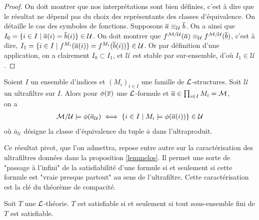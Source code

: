 \begin{proof}
On doit montrer que nos interprétations sont bien définies, c'est à dire que le résultat ne dépend pas du choix des représentants des classes d'équivalence.
On détaille le cas des symboles de fonctions.
Supposons $\overline{a} \equiv_{\mathcal{U}} \overline{b}$. On a ainsi que $I_0 = \{ i \in I \mid \overline{a}(i) = \overline{b}(i) \} \in \mathcal{U}$.
On doit montrer que $f^{\mathcal{M}/\mathcal{U}}(\overline{a}) \equiv_{\mathcal{U}} f^{\mathcal{M}/\mathcal{U}}(\overline{b})$, c'est à dire,
$I_1 = \{ i \in I \mid f^{M_i}(\overline{a}(i)) = f^{M_i}(\overline{b}(i)) \} \in \mathcal{U}$. Or par définition d'une application,
on a clairement $I_0 \subset I_1$, et $\mathcal{U}$ est stable par sur-ensemble, d'où $I_1 \in \mathcal{U}$.
\end{proof}


\begin{theo}[théorème de \L{}oś]\label{Los}
Soient $I$ un ensemble d'indices et $(M_i)_{i \in I}$ une famille de $\mathcal{L}$-structures. Soit $\mathcal{U}$ un ultrafiltre sur $I$.
Alors pour $\phi(\overline{x})$ une $\mathcal{L}$-formule et $\overline{a} \in \prod_{i \in I} M_i = \mathcal{M}$,\\on a
\begin{align*}
\mathcal{M}/\mathcal{U} \models \phi(\overline{a}_{\mathcal{U}}) \iff \{ i \in I \mid M_i \models \phi(\overline{a}(i)) \} \in \mathcal{U}
\end{align*}
où $\bar{a}_\mathcal{U}$ désigne la classe d'équivalence du tuple $\bar{a}$ dans l'ultraproduit.
\end{theo}

\begin{rema}
Ce résultat pivot, que l'on admettra, repose entre autre sur la caractérisation des ultrafiltres données dans la proposition \ref{lemmelos}.
Il permet une sorte de "passage à l'infini" de la satisfiabilité d'une formule si et seulement si
cette formule est "vraie presque partout" au sens de l'ultrafiltre. Cette caractérisation est la clé du théorème de compacité.
\end{rema}

\begin{theo}\label{theo-compacite}
Soit $T$ une $\mathcal{L}$-théorie. $T$ est satisfiable si et seulement si tout sous-ensemble fini de $T$ est satisfiable.
\end{theo}

